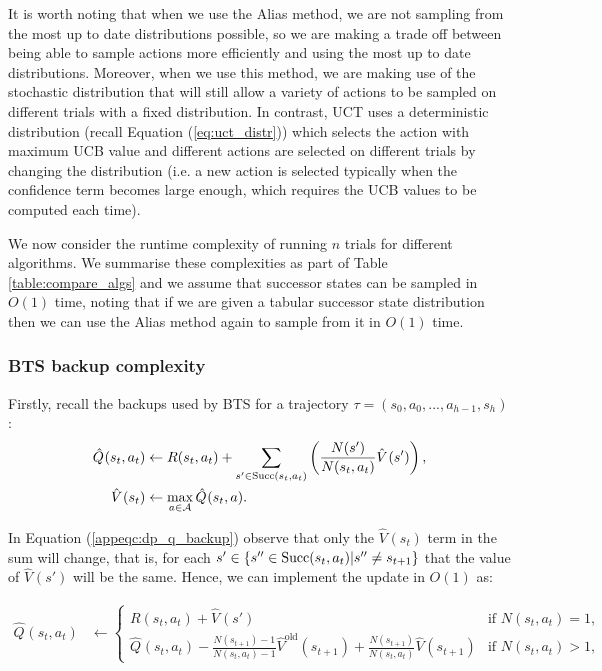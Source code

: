 \documentclass{article}
\newcommand{\cl}[1]{\mathcal{#1}}
\newcommand{\Vt}[2]{\hat{V}^{#2}(#1)}
\newcommand{\Qt}[3]{\hat{Q}^{#3}(#1,#2)}
\newcommand{\succc}[2]{\textnormal{Succ}(#1,#2)}
\theoremstyle{plain}
\begin{document}
\begin{appendices}
        It is worth noting that when we use the Alias method, we are not sampling from the most up to date distributions possible, so we are making a trade off between being able to sample actions more efficiently and using the most up to date distributions. Moreover, when we use this method, we are making use of the stochastic distribution that will still allow a variety of actions to be sampled on different trials with a fixed distribution. In contrast, UCT uses a deterministic distribution (recall Equation (\ref{eq:uct_distr})) which selects the action with maximum UCB value and different actions are selected on different trials by changing the distribution (i.e. a new action is selected typically when the confidence term becomes large enough, which requires the UCB values to be computed each time).
        
        We now consider the runtime complexity of running $n$ trials for different algorithms. We summarise these complexities as part of Table \ref{table:compare_algs} and we assume that successor states can be sampled in $O(1)$ time, noting that if we are given a tabular successor state distribution then we can use the Alias method again to sample from it in $O(1)$ time. 
        
        \subsubsection{BTS backup complexity}
        
        		Firstly, recall the backups used by BTS for a trajectory $\tau=(s_0,a_0,...,a_{h-1},s_h)$:
	        \begin{align}
	            \Qt{s_t}{a_t}{} &\leftarrow R(s_t,a_t) + \sum_{s' \in \succc{s_t}{a_t}} \left( \frac{N(s')}{N(s_t,a_t)} \Vt{s'}{} \right), \label{appeqc:dp_q_backup} \\ 
	            \Vt{s_t}{} &\leftarrow\max_{a\in\cl{A}} \Qt{s_t}{a}{}. \label{appeqc:dp_v_backup} 
	        \end{align}
	        
	        In Equation (\ref{appeqc:dp_q_backup}) observe that only the $\Vt{s_t}{}$ term in the sum will change, that is, for each $s' \in \{s''\in\succc{s_t}{a_t}|s''\neq s_{t+1}\}$ that the value of $\Vt{s'}{}$ will be the same. Hence, we can implement the update in $O(1)$ as:
        		
	        \begin{align}
	            \Qt{s_t}{a_t}{} &\leftarrow 
				\begin{cases}
					R(s_t,a_t) + \Vt{s'}{} & \text{if } N(s_t,a_t) = 1, \\
					\Qt{s_t}{a_t}{} - \frac{N(s_{t+1})-1}{N(s_t,a_t)-1} \Vt{s_{t+1}}{\text{old}} + \frac{N(s_{t+1})}{N(s_t,a_t)} \Vt{s_{t+1}}{} & \text{if } N(s_t,a_t) > 1,
				\end{cases}	\label{appeqc:opt_q_backup}
	        \end{align}
	        

\end{appendices}
\end{document}
